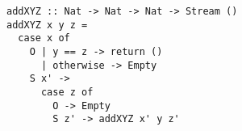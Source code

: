 \begin{figure}[!t]
  \centering
  \begin{minipage}{\columnwidth}
    \begin{lstlisting}[label={add_x_y_z}, caption={Function for \lstinline{addo in in in} direction}, captionpos=b, frame=tb]
addXYZ :: Nat -> Nat -> Nat -> Stream ()
addXYZ x y z =
  case x of
    O | y == z -> return ()
      | otherwise -> Empty
    S x' ->
      case z of
        O -> Empty
        S z' -> addXYZ x' y z'
    \end{lstlisting}
  \end{minipage}
\end{figure}